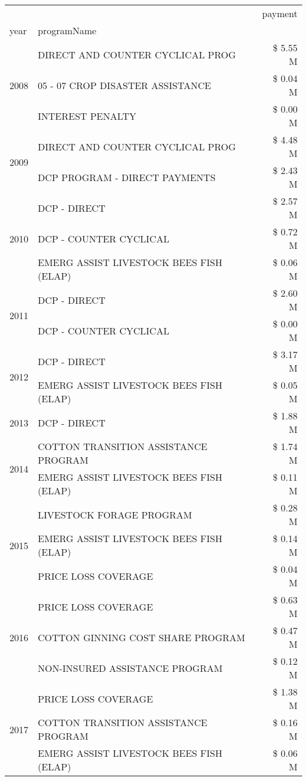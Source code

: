 \begin{tabular}{llr}
\toprule
 &  & payment \\
year & programName &  \\
\midrule
\multirow[t]{3}{*}{2008} & DIRECT AND COUNTER CYCLICAL PROG & \$ 5.55 M \\
 & 05 - 07 CROP DISASTER ASSISTANCE & \$ 0.04 M \\
 & INTEREST PENALTY & \$ 0.00 M \\
\cline{1-3}
\multirow[t]{2}{*}{2009} & DIRECT AND COUNTER CYCLICAL PROG & \$ 4.48 M \\
 & DCP PROGRAM - DIRECT PAYMENTS & \$ 2.43 M \\
\cline{1-3}
\multirow[t]{3}{*}{2010} & DCP - DIRECT & \$ 2.57 M \\
 & DCP - COUNTER CYCLICAL & \$ 0.72 M \\
 & EMERG ASSIST LIVESTOCK BEES FISH (ELAP) & \$ 0.06 M \\
\cline{1-3}
\multirow[t]{2}{*}{2011} & DCP - DIRECT & \$ 2.60 M \\
 & DCP - COUNTER CYCLICAL & \$ 0.00 M \\
\cline{1-3}
\multirow[t]{2}{*}{2012} & DCP - DIRECT & \$ 3.17 M \\
 & EMERG ASSIST LIVESTOCK BEES FISH (ELAP) & \$ 0.05 M \\
\cline{1-3}
2013 & DCP - DIRECT & \$ 1.88 M \\
\cline{1-3}
\multirow[t]{2}{*}{2014} & COTTON TRANSITION ASSISTANCE PROGRAM & \$ 1.74 M \\
 & EMERG ASSIST LIVESTOCK BEES FISH (ELAP) & \$ 0.11 M \\
\cline{1-3}
\multirow[t]{3}{*}{2015} & LIVESTOCK FORAGE PROGRAM & \$ 0.28 M \\
 & EMERG ASSIST LIVESTOCK BEES FISH (ELAP) & \$ 0.14 M \\
 & PRICE LOSS COVERAGE & \$ 0.04 M \\
\cline{1-3}
\multirow[t]{3}{*}{2016} & PRICE LOSS COVERAGE & \$ 0.63 M \\
 & COTTON GINNING COST SHARE PROGRAM & \$ 0.47 M \\
 & NON-INSURED ASSISTANCE PROGRAM & \$ 0.12 M \\
\cline{1-3}
\multirow[t]{3}{*}{2017} & PRICE LOSS COVERAGE & \$ 1.38 M \\
 & COTTON TRANSITION ASSISTANCE PROGRAM & \$ 0.16 M \\
 & EMERG ASSIST LIVESTOCK BEES FISH (ELAP) & \$ 0.06 M \\
\cline{1-3}

\end{tabular}
